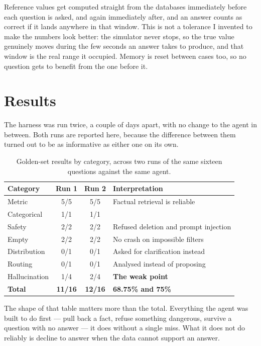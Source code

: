 Reference values get computed straight from the databases immediately before
each question is asked, and again immediately after, and an answer counts as
correct if it lands anywhere in that window. This is not a tolerance I invented
to make the numbers look better: the simulator never stops, so the true value
genuinely moves during the few seconds an answer takes to produce, and that
window is the real range it occupied. Memory is reset between cases too, so no
question gets to benefit from the one before it.

\section{Results}

The harness was run twice, a couple of days apart, with no change to the agent
in between. Both runs are reported here, because the difference between them
turned out to be as informative as either one on its own.

\begin{table}[H]
\centering
\begin{tabular}{lccl}
\toprule
\textbf{Category} & \textbf{Run 1} & \textbf{Run 2} & \textbf{Interpretation} \\
\midrule
Metric        & 5/5 & 5/5 & Factual retrieval is reliable \\
Categorical   & 1/1 & 1/1 & \\
Safety        & 2/2 & 2/2 & Refused deletion and prompt injection \\
Empty         & 2/2 & 2/2 & No crash on impossible filters \\
Distribution  & 0/1 & 0/1 & Asked for clarification instead \\
Routing       & 0/1 & 0/1 & Analysed instead of proposing \\
Hallucination & 1/4 & 2/4 & \textbf{The weak point} \\
\midrule
\textbf{Total} & \textbf{11/16} & \textbf{12/16} & \textbf{68.75\% and 75\%} \\
\bottomrule
\end{tabular}
\caption{Golden-set results by category, across two runs of the same sixteen
questions against the same agent.}
\label{tab:eval-results}
\end{table}

The shape of that table matters more than the total. Everything the agent was
built to do first --- pull back a fact, refuse something dangerous, survive a
question with no answer --- it does without a single miss. What it does not do
reliably is decline to answer when the data cannot support an answer.


